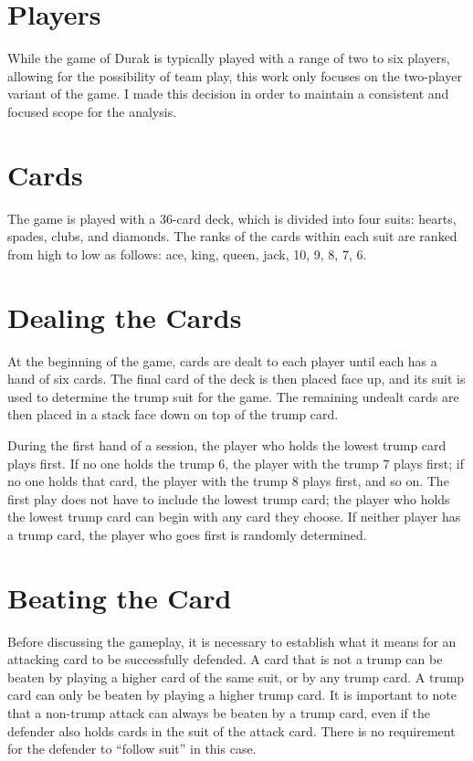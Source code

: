 \section{Players}
While the game of Durak is typically played with a range of two to six players, allowing for the possibility of team play, this work only focuses on the two-player variant of the game. I made this decision in order to maintain a consistent and focused scope for the analysis.

\section{Cards}
The game is played with a 36-card deck, which is divided into four suits: hearts, spades, clubs, and diamonds. The ranks of the cards within each suit are ranked from high to low as follows: ace, king, queen, jack, 10, 9, 8, 7, 6.

\section{Dealing the Cards}
\label{dealingCards}
At the beginning of the game, cards are dealt to each player until each has a hand of six cards. The final card of the deck is then placed face up, and its suit is used to determine the trump suit for the game. The remaining undealt cards are then placed in a stack face down on top of the trump card.

During the first hand of a session, the player who holds the lowest trump card plays first. If no one holds the trump 6, the player with the trump 7 plays first; if no one holds that card, the player with the trump 8 plays first, and so on. The first play does not have to include the lowest trump card; the player who holds the lowest trump card can begin with any card they choose. If neither player has a trump card, the player who goes first is randomly determined.

\section{Beating the Card} 
\label{BeatingRule}
Before discussing the gameplay, it is necessary to establish what it means for an attacking card to be successfully defended. A card that is not a trump can be beaten by playing a higher card of the same suit, or by any trump card. A trump card can only be beaten by playing a higher trump card. It is important to note that a non-trump attack can always be beaten by a trump card, even if the defender also holds cards in the suit of the attack card. There is no requirement for the defender to ``follow suit'' in this case.

